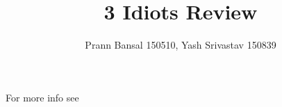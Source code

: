 \documentclass{article}
\title{3 Idiots Review}
\author{Prann Bansal 150510, Yash Srivastav 150839}
\begin{document}
\maketitle

For more info see \cite{indiatimes-article}


\end{document}
